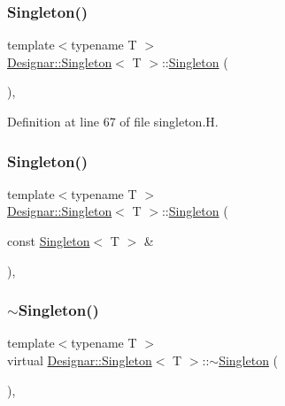 \subsubsection{\texorpdfstring{Singleton()}{Singleton()}\hspace{0.1cm}{\footnotesize\ttfamily [1/2]}}
{\footnotesize\ttfamily template$<$typename T $>$ \\
\hyperlink{class_designar_1_1_singleton}{Designar\+::\+Singleton}$<$ T $>$\+::\hyperlink{class_designar_1_1_singleton}{Singleton} (\begin{DoxyParamCaption}{ }\end{DoxyParamCaption})\hspace{0.3cm}{\ttfamily [inline]}, {\ttfamily [protected]}}



Definition at line 67 of file singleton.\+H.

\mbox{\label{class_designar_1_1_singleton_a961a62f81db43d2b610949a76f9645f2}} 
\subsubsection{\texorpdfstring{Singleton()}{Singleton()}\hspace{0.1cm}{\footnotesize\ttfamily [2/2]}}
{\footnotesize\ttfamily template$<$typename T $>$ \\
\hyperlink{class_designar_1_1_singleton}{Designar\+::\+Singleton}$<$ T $>$\+::\hyperlink{class_designar_1_1_singleton}{Singleton} (\begin{DoxyParamCaption}\item[{const \hyperlink{class_designar_1_1_singleton}{Singleton}$<$ T $>$ \&}]{ }\end{DoxyParamCaption})\hspace{0.3cm}{\ttfamily [protected]}, {\ttfamily [delete]}}

\mbox{\label{class_designar_1_1_singleton_abf7976824a492dd42ed608bcafb8d98d}} 
\subsubsection{\texorpdfstring{$\sim$\+Singleton()}{~Singleton()}}
{\footnotesize\ttfamily template$<$typename T $>$ \\
virtual \hyperlink{class_designar_1_1_singleton}{Designar\+::\+Singleton}$<$ T $>$\+::$\sim$\hyperlink{class_designar_1_1_singleton}{Singleton} (\begin{DoxyParamCaption}{ }\end{DoxyParamCaption})\hspace{0.3cm}{\ttfamily [inline]}, {\ttfamily [virtual]}}



